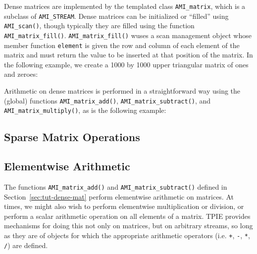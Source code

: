 Dense matrices are implemented by the templated class
\lstinline|AMI_matrix|, which is a
subclass of \lstinline|AMI_STREAM|. Dense matrices can be initialized or ``filled''
using \lstinline|AMI_scan()|, though typically they are filled using
the function \lstinline|AMI_matrix_fill()|.
\lstinline|AMI_matrix_fill()| wuses a scan management object whose
member function \lstinline|element| is given the row and column of
each element of the matrix and must return the value to be inserted at
that position of the matrix. In the following example, we create a
1000 by 1000 upper triangular matrix of ones and zeroes:



Arithmetic on dense matrices is performed in a straightforward way
using the (global) functions \lstinline|AMI_matrix_add()|,
\lstinline|AMI_matrix_subtract()|, and
\lstinline|AMI_matrix_multiply()|, as is the following example:




\subsection{Sparse Matrix Operations}


\tobewritten


\subsection{Elementwise Arithmetic}

 The functions
\lstinline|AMI_matrix_add()| and \lstinline|AMI_matrix_subtract()|
defined in Section~\ref{sec:tut-dense-mat} perform elementwise
arithmetic on matrices.  At times, we might also wish to perform
elementwise multiplication or division, or perform a scalar arithmetic
operation on all elements of a matrix.  TPIE provides mechanisms for
doing this not only on matrices, but on arbitrary streams, so long as
they are of objects for which the appropriate arithmetic operators
(i.e. \lstinline|+|, \lstinline|-|, \lstinline|*|, \lstinline|/|) are
defined.


